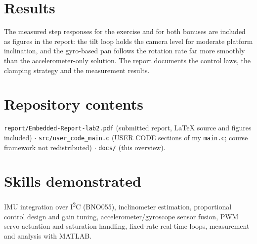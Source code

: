\documentclass[10pt,a4paper]{article}
\begin{document}
\section*{Results}
The measured step responses for the exercise and for both bonuses are included as figures in the report: the tilt
loop holds the camera level for moderate platform inclination, and the gyro-based pan follows the rotation rate far
more smoothly than the accelerometer-only solution. The report documents the control laws, the clamping strategy and
the measurement results.

\section*{Repository contents}
\texttt{report/Embedded-Report-lab2.pdf} (submitted report, LaTeX source and figures included) $\cdot$
\texttt{src/user\_code\_main.c} (USER CODE sections of my \texttt{main.c}; course framework not redistributed) $\cdot$
\texttt{docs/} (this overview).

\section*{Skills demonstrated}
IMU integration over I\textsuperscript{2}C (BNO055), inclinometer estimation, proportional control design and gain
tuning, accelerometer/gyroscope sensor fusion, PWM servo actuation and saturation handling, fixed-rate real-time
loops, measurement and analysis with MATLAB.
\end{document}
